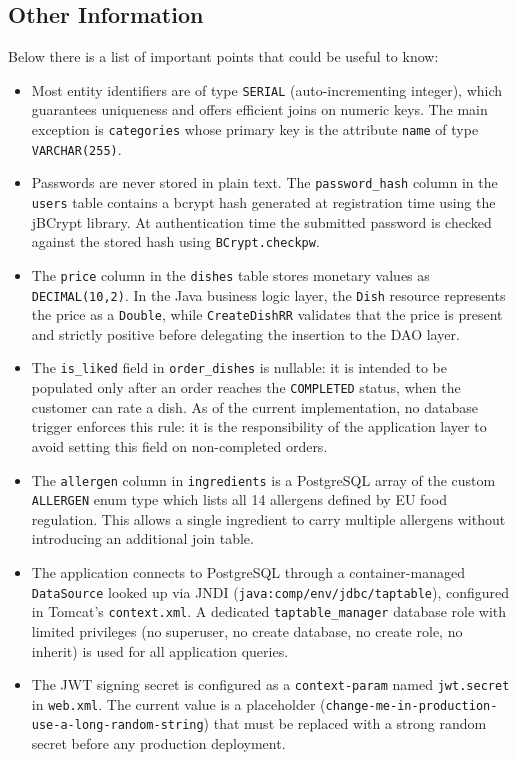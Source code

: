 \subsection{Other Information}
Below there is a list of important points that could be useful to know:

\begin{itemize}
    \item Most entity identifiers are of type \texttt{SERIAL} (auto-incrementing integer), which guarantees uniqueness and offers efficient joins on numeric keys. The main exception is \texttt{categories} whose primary key is the attribute \texttt{name} of type \texttt{VARCHAR(255)}.

    \item Passwords are never stored in plain text. The \texttt{password\_hash} column in the \texttt{users} table contains a bcrypt hash generated at registration time using the jBCrypt library. At authentication time the submitted password is checked against the stored hash using \texttt{BCrypt.checkpw}.

    \item The \texttt{price} column in the \texttt{dishes} table stores monetary values as \texttt{DECIMAL(10,2)}. In the Java business logic layer, the \texttt{Dish} resource represents the price as a \texttt{Double}, while \texttt{CreateDishRR} validates that the price is present and strictly positive before delegating the insertion to the DAO layer.

    \item The \texttt{is\_liked} field in \texttt{order\_dishes} is nullable: it is intended to be populated only after an order reaches the \texttt{COMPLETED} status, when the customer can rate a dish. As of the current implementation, no database trigger enforces this rule: it is the responsibility of the application layer to avoid setting this field on non-completed orders.

    \item The \texttt{allergen} column in \texttt{ingredients} is a PostgreSQL array of the custom \texttt{ALLERGEN} enum type which lists all 14 allergens defined by EU food regulation. This allows a single ingredient to carry multiple allergens without introducing an additional join table. 

    \item The application connects to PostgreSQL through a container-managed \texttt{DataSource} looked up via JNDI (\texttt{java:comp/env/jdbc/taptable}), configured in Tomcat's \texttt{context.xml}. A dedicated \texttt{taptable\_manager} database role with limited privileges (no superuser, no create database, no create role, no inherit) is used for all application queries.

    \item The JWT signing secret is configured as a \texttt{context-param} named \texttt{jwt.secret} in \texttt{web.xml}. The current value is a placeholder (\texttt{change-me-in-production-use-a-long-random-string}) that must be replaced with a strong random secret before any production deployment.
\end{itemize}